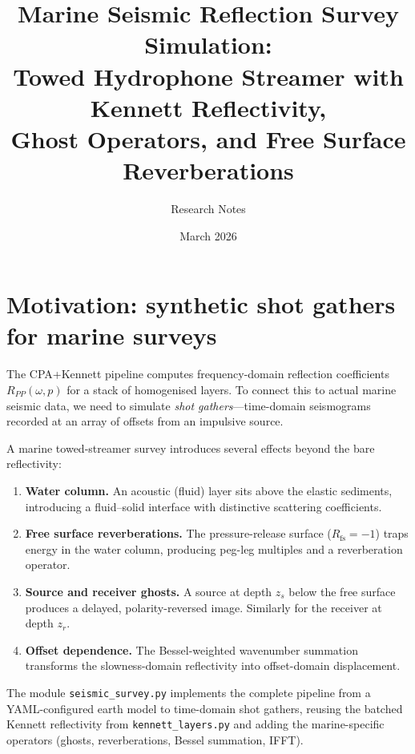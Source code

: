 \documentclass[11pt,a4paper]{article}
\title{Marine Seismic Reflection Survey Simulation:\\
Towed Hydrophone Streamer with Kennett Reflectivity,\\
Ghost Operators, and Free Surface Reverberations}
\author{Research Notes}
\date{March 2026}
\begin{document}
\maketitle

\tableofcontents
\vspace{1em}

\section{Motivation: synthetic shot gathers for marine surveys}
\label{sec:motivation}

The CPA+Kennett pipeline computes frequency-domain reflection
coefficients $R_{PP}(\omega, p)$ for a stack of homogenised layers.
To connect this to actual marine seismic data, we need to simulate
\emph{shot gathers}---time-domain seismograms recorded at an array
of offsets from an impulsive source.

A marine towed-streamer survey introduces several effects beyond
the bare reflectivity:
\begin{enumerate}[nosep]
  \item \textbf{Water column.}  An acoustic (fluid) layer sits above
    the elastic sediments, introducing a fluid--solid interface with
    distinctive scattering coefficients.
  \item \textbf{Free surface reverberations.}  The pressure-release
    surface ($R_{\text{fs}} = -1$) traps energy in the water column,
    producing peg-leg multiples and a reverberation operator.
  \item \textbf{Source and receiver ghosts.}  A source at depth $z_s$
    below the free surface produces a delayed, polarity-reversed
    image.  Similarly for the receiver at depth $z_r$.
  \item \textbf{Offset dependence.}  The Bessel-weighted wavenumber
    summation transforms the slowness-domain reflectivity into
    offset-domain displacement.
\end{enumerate}

The module \texttt{seismic\_survey.py} implements the complete
pipeline from a YAML-configured earth model to time-domain shot
gathers, reusing the batched Kennett reflectivity from
\texttt{kennett\_layers.py} and adding the marine-specific operators
(ghosts, reverberations, Bessel summation, IFFT).

\end{document}
